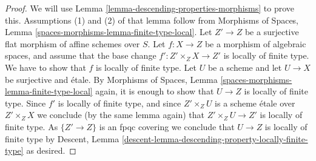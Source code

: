 \documentclass[10pt,a4paper]{amsart}
\theoremstyle{plain}
\theoremstyle{definition}
\theoremstyle{remark}
\numberwithin{equation}{subsection}
\begin{document}
\begin{proof}
We will use
Lemma \ref{lemma-descending-properties-morphisms}
to prove this. Assumptions (1) and (2) of that lemma follow from
Morphisms of Spaces,
Lemma \ref{spaces-morphisms-lemma-finite-type-local}.
Let $Z' \to Z$ be a surjective flat morphism of affine schemes over $S$.
Let $f : X \to Z$ be a morphism of algebraic spaces, and assume
that the base change $f' : Z' \times_Z X \to Z'$ is locally of finite type.
We have to show that $f$ is locally of finite type. Let $U$ be a scheme
and let $U \to X$ be surjective and \'etale. By
Morphisms of Spaces,
Lemma \ref{spaces-morphisms-lemma-finite-type-local}
again, it is enough to show that $U \to Z$ is locally of finite type.
Since $f'$ is locally of finite type, and since $Z' \times_Z U$ is a
scheme \'etale over $Z' \times_Z X$ we conclude (by the same lemma again) that
$Z' \times_Z U \to Z'$ is locally of finite type.
As $\{Z' \to Z\}$ is an fpqc covering we conclude that
$U \to Z$ is locally of finite type by
Descent, Lemma \ref{descent-lemma-descending-property-locally-finite-type}
as desired.
\end{proof}
\end{document}
